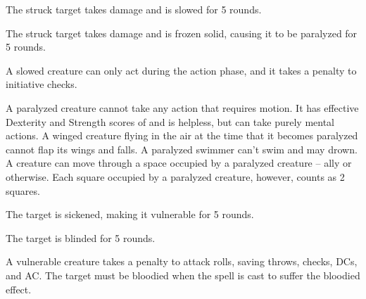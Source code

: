 \spellrng{\rngclose}
\begin{spellhealthy}
  The struck target takes damage and is slowed for 5 rounds.
\end{spellhealthy}
\begin{spellblood}
  The struck target takes damage and is frozen solid, causing it to be paralyzed for 5 rounds.
\end{spellblood}
\begin{spellnotes}
    A slowed creature can only act during the action phase, and it takes a  penalty to initiative checks.

   A paralyzed creature cannot take any action that requires motion. It has effective Dexterity and Strength scores of  and is helpless, but can take purely mental actions. A winged creature flying in the air at the time that it becomes paralyzed cannot flap its wings and falls. A paralyzed swimmer can't swim and may drown. A creature can move through a space occupied by a paralyzed creature -- ally or otherwise. Each square occupied by a paralyzed creature, however, counts as 2 squares.
 \end{spellnotes}

\spellrng{\rngclose}
\begin{spellhealthy}
  The target is sickened, making it vulnerable for 5 rounds.
\end{spellhealthy}
\begin{spellblood}
  The target is blinded for 5 rounds.
\end{spellblood}
\begin{spellnotes}
  A vulnerable creature takes a  penalty to attack rolls, saving throws, checks, DCs, and AC.
  The target must be bloodied when the spell is cast to suffer the bloodied effect.
\end{spellnotes}

